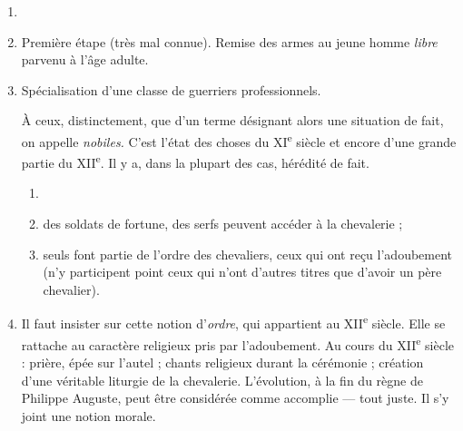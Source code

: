 \documentclass[french,twoside]{book} %
\begin{document}
\begin{enumerate}[itemsep=\baselineskip,]
\item 
{}
\item Première étape (très mal connue). Remise des armes au jeune homme {\itshape libre} parvenu à l’âge adulte.
\item Spécialisation d’une classe de guerriers professionnels.\par

À ceux, distinctement, que d’un terme désignant alors une situation de fait, on appelle {\itshape nobiles.} C’est l’état des choses du XI\textsuperscript{e} siècle et encore d’une grande partie du XII\textsuperscript{e}. Il y a, dans la plupart des cas, hérédité de fait.\par
\label{p64}
\begin{enumerate}[itemsep=0pt,]
\item[] \hspace{-1.5em}{\bfseries Mais :}
\item des soldats de fortune, des serfs peuvent accéder à la chevalerie ;
\item seuls font partie de l’ordre des chevaliers, ceux qui ont reçu l’adoubement (n’y participent point ceux qui n’ont d’autres titres que d’avoir un père chevalier).

\end{enumerate}
\item Il faut insister sur cette notion d’{\itshape ordre}, qui appartient au XII\textsuperscript{e} siècle. Elle se rattache au caractère religieux pris par l’adoubement. Au cours du XII\textsuperscript{e} siècle : prière, épée sur l’autel ; chants religieux durant la cérémonie ; création d’une véritable liturgie de la chevalerie. L’évolution, à la fin du règne de Philippe Auguste, peut être considérée comme accomplie — tout juste. Il s’y joint une notion morale.\par


\end{enumerate}
\end{document}
